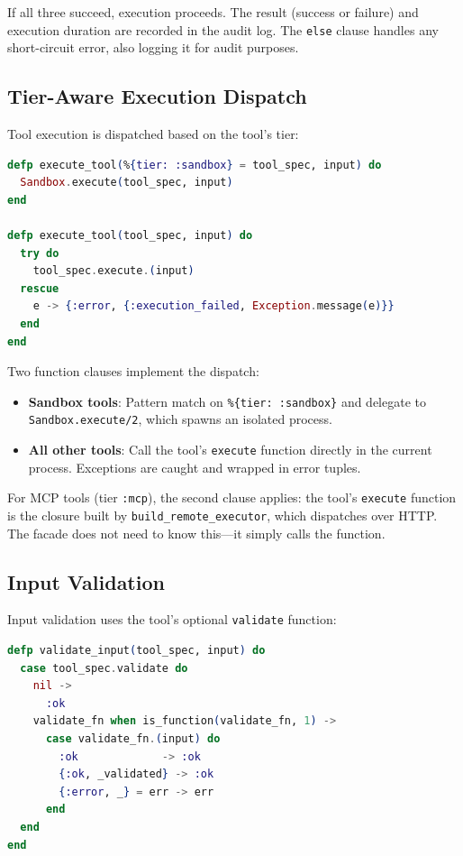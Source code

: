 \documentclass[12pt,a4paper]{article}
\theoremstyle{plain}
\theoremstyle{definition}
\begin{document}
If all three succeed, execution proceeds. The result (success or failure) and execution duration are recorded in the audit log. The \texttt{else} clause handles any short-circuit error, also logging it for audit purposes.

\subsection{Tier-Aware Execution Dispatch}

Tool execution is dispatched based on the tool's tier:

\begin{lstlisting}[language=elixir, caption={Tier-aware execution dispatch via pattern matching.}, label={lst:dispatch}]
defp execute_tool(%{tier: :sandbox} = tool_spec, input) do
  Sandbox.execute(tool_spec, input)
end

defp execute_tool(tool_spec, input) do
  try do
    tool_spec.execute.(input)
  rescue
    e -> {:error, {:execution_failed, Exception.message(e)}}
  end
end
\end{lstlisting}

Two function clauses implement the dispatch:

\begin{itemize}[leftmargin=2em]
\item \textbf{Sandbox tools}: Pattern match on \texttt{\%\{tier: :sandbox\}} and delegate to \texttt{Sandbox.execute/2}, which spawns an isolated process.
\item \textbf{All other tools}: Call the tool's \texttt{execute} function directly in the current process. Exceptions are caught and wrapped in error tuples.
\end{itemize}

For MCP tools (tier \texttt{:mcp}), the second clause applies: the tool's \texttt{execute} function is the closure built by \texttt{build\_remote\_executor}, which dispatches over HTTP. The facade does not need to know this---it simply calls the function.

\subsection{Input Validation}

Input validation uses the tool's optional \texttt{validate} function:

\begin{lstlisting}[language=elixir, caption={Input validation with optional validator.}, label={lst:validate-input}]
defp validate_input(tool_spec, input) do
  case tool_spec.validate do
    nil ->
      :ok
    validate_fn when is_function(validate_fn, 1) ->
      case validate_fn.(input) do
        :ok             -> :ok
        {:ok, _validated} -> :ok
        {:error, _} = err -> err
      end
  end
end
\end{lstlisting}
\end{document}
